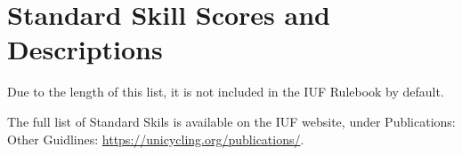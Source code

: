 \section{Standard Skill Scores and Descriptions}

Due to the length of this list, it is not included in the IUF Rulebook by default.

The full list of Standard Skils is available on the IUF website, under Publications: Other Guidlines: \url{https://unicycling.org/publications/}.